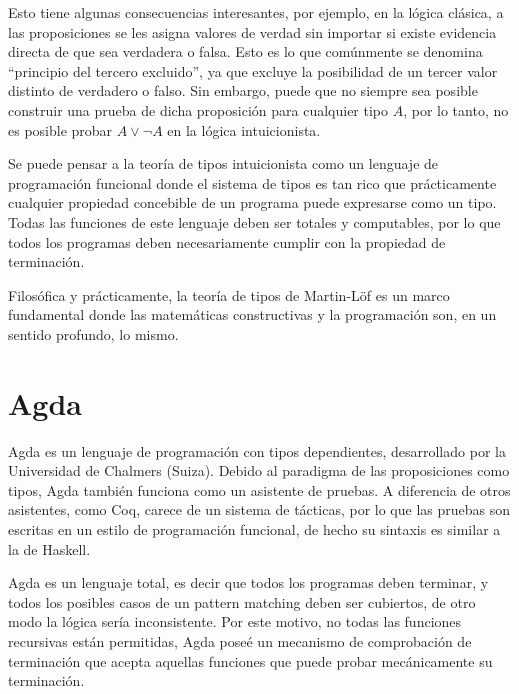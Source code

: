 \documentclass[]{report}
\begin{document}
	Esto tiene algunas consecuencias interesantes, por ejemplo, en la lógica clásica, a las proposiciones se les asigna valores de verdad sin importar si existe evidencia directa de que sea verdadera o falsa.
	Esto es lo que comúnmente se denomina ``principio del tercero excluido'', ya que excluye la posibilidad de un tercer valor distinto de verdadero o falso.
	Sin embargo, puede que no siempre sea posible construir una prueba de dicha proposición para cualquier tipo $A$, por lo tanto, no es posible probar $A \vee \neg A$ en la lógica intuicionista.

	
	Se puede pensar a la teoría de tipos intuicionista como un lenguaje de programación funcional donde el sistema de tipos es tan rico que prácticamente cualquier propiedad concebible de un programa puede expresarse como un tipo.
	Todas las funciones de este lenguaje deben ser totales y computables, por lo que todos los programas deben necesariamente cumplir con la propiedad de terminación.
	
	Filosófica y prácticamente, la teoría de tipos de Martin-Löf es un marco fundamental donde las matemáticas constructivas y la programación son, en un sentido profundo, lo mismo.
	
	
	\section{Agda}
	Agda es un lenguaje de programación con tipos dependientes, desarrollado por la Universidad de
	Chalmers (Suiza).
	Debido al paradigma de las proposiciones como tipos, Agda también funciona como un asistente de pruebas.
	A diferencia de otros asistentes, como Coq, carece de un sistema de tácticas, por lo que las pruebas son escritas en un estilo de programación funcional, de hecho su sintaxis es similar a la de Haskell.

	Agda es un lenguaje total, es decir que todos los programas deben terminar, y todos los posibles casos de un pattern matching deben ser cubiertos, de otro modo la lógica sería inconsistente.
	Por este motivo, no todas las funciones recursivas están permitidas, Agda poseé un mecanismo de comprobación de terminación que acepta aquellas funciones que puede probar mecánicamente su terminación.
	
	
\end{document}
